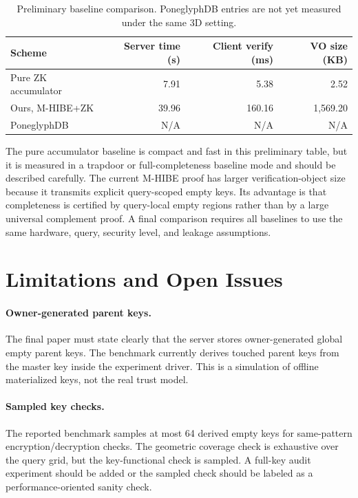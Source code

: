 \documentclass[11pt]{article}
\begin{document}
\begin{table}[t]
\centering
\caption{Preliminary baseline comparison. PoneglyphDB entries are not yet measured under the same 3D setting.}
\label{tab:baseline}
\begin{tabular}{lrrr}
\toprule
Scheme & Server time (s) & Client verify (ms) & VO size (KB) \\
\midrule
Pure ZK accumulator & 7.91 & 5.38 & 2.52 \\
Ours, M-HIBE+ZK & 39.96 & 160.16 & 1,569.20 \\
PoneglyphDB & N/A & N/A & N/A \\
\bottomrule
\end{tabular}
\end{table}

The pure accumulator baseline is compact and fast in this preliminary table, but it is measured in a trapdoor or full-completeness baseline mode and should be described carefully. The current M-HIBE proof has larger verification-object size because it transmits explicit query-scoped empty keys. Its advantage is that completeness is certified by query-local empty regions rather than by a large universal complement proof. A final comparison requires all baselines to use the same hardware, query, security level, and leakage assumptions.

\section{Limitations and Open Issues}

\paragraph{Owner-generated parent keys.}
The final paper must state clearly that the server stores owner-generated global empty parent keys. The benchmark currently derives touched parent keys from the master key inside the experiment driver. This is a simulation of offline materialized keys, not the real trust model.

\paragraph{Sampled key checks.}
The reported benchmark samples at most 64 derived empty keys for same-pattern encryption/decryption checks. The geometric coverage check is exhaustive over the query grid, but the key-functional check is sampled. A full-key audit experiment should be added or the sampled check should be labeled as a performance-oriented sanity check.
\end{document}
